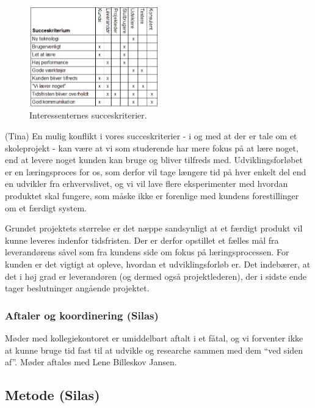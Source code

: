 \documentclass[12pt, a4paper]{report}
\begin{document}
\begin{figure}[ht!]
  \centering
  \includegraphics[width=0.5\textwidth]{succeskriterium}
  \caption{Interessenternes succeskriterier.}
\end{figure}

(Tina)
En mulig konflikt i vores succeskriterier - i og med at der er tale om et skoleprojekt - kan være at vi som studerende har mere fokus på at lære noget, end at levere noget kunden kan bruge og bliver tilfreds med. Udviklingsforløbet er en læringsproces for os, som derfor vil tage længere tid på hver enkelt del end en udvikler fra erhvervslivet, og vi vil lave flere eksperimenter med hvordan produktet skal fungere, som måske ikke er forenlige med kundens forestillinger om et færdigt system.

Grundet projektets størrelse er det næppe sandsynligt at et færdigt produkt vil kunne leveres indenfor tidsfristen. Der er derfor opstillet et fælles mål fra leverandørens såvel som fra kundens side om fokus på læringsprocessen. For kunden er det vigtigt at opleve, hvordan et udviklingsforløb er. Det indebærer, at det i høj grad er leverandøren (og dermed også projektlederen), der i sidste ende tager beslutninger angående projektet.

\subsubsection{Aftaler og koordinering (Silas)}
Møder med kollegiekontoret er umiddelbart aftalt i et fåtal, og vi forventer ikke at kunne bruge tid fast til at udvikle og researche sammen med dem “ved siden af”. Møder aftales med Lene Billeskov Jansen.

\subsection{Metode (Silas)}
\end{document}
